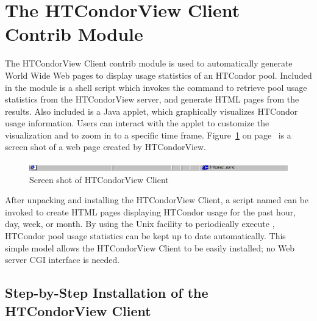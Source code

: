 \section{\label{sec:HTCondorView-Client-Install}
The HTCondorView Client Contrib Module} 

The HTCondorView Client contrib module is used to automatically generate
World Wide Web pages to display usage statistics of an HTCondor
pool.
Included in the module is a shell script which invokes the 
command to retrieve pool usage statistics from the HTCondorView server, and
generate HTML pages from the results.  
Also included is a Java applet, which graphically visualizes HTCondor 
usage information.  
Users can interact with the applet to customize the visualization and to
zoom in to a specific time frame.
Figure~\ref{fig:view-screenshot} on page~\pageref{fig:view-screenshot}
is a screen shot of a web page created by HTCondorView.  

\begin{figure}[hbt]
\centering
\includegraphics{contrib/view-screenshot}
\caption{\label{fig:view-screenshot}Screen shot of HTCondorView Client}
\end{figure}

After unpacking and installing the HTCondorView Client, a script named
 can be invoked to create HTML pages displaying HTCondor usage
for the past hour, day, week, or month.  
By using the Unix  facility to periodically execute
, HTCondor pool usage statistics can be kept up to date
automatically.  
This simple model allows the HTCondorView Client to be easily installed;
no Web server CGI interface is needed.

\subsection{\label{sec:condorview-client-step-by-step}
Step-by-Step Installation of the HTCondorView Client}

